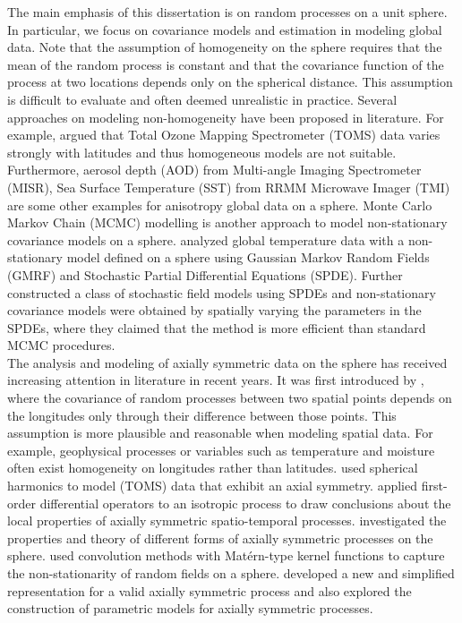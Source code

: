 The main emphasis of this dissertation is on random processes on a unit sphere. In particular, we focus on covariance models and estimation in modeling global data. Note that the assumption of homogeneity on the sphere requires that the mean of the random process is constant and that the covariance function of the process at two locations depends only on the spherical distance. This assumption is difficult to evaluate and often deemed unrealistic in practice. Several approaches on modeling non-homogeneity have been proposed in literature. For example, \cite{Stein2007} argued that Total Ozone Mapping Spectrometer (TOMS) data varies strongly with latitudes and thus homogeneous models are not suitable. Furthermore, aerosol depth (AOD) from Multi-angle Imaging Spectrometer (MISR), Sea Surface Temperature (SST) from RRMM Microwave Imager (TMI) are some other examples for anisotropy global data on a sphere. Monte Carlo Markov Chain (MCMC) modelling is another approach to model non-stationary covariance models on a sphere. \cite{Lindgren2011} analyzed global temperature data with a non-stationary model defined on a sphere using Gaussian Markov Random Fields (GMRF) and Stochastic Partial Differential Equations (SPDE). Further \cite{BolinLindgren2011} constructed a class of stochastic field models using SPDEs and non-stationary covariance models were obtained by spatially varying the parameters in the SPDEs, where they claimed that the method is more efficient than standard MCMC procedures. \\

The analysis and modeling of axially symmetric data on the sphere has received increasing attention in literature in recent years. It was first introduced by \cite{Jones1963}, where the covariance of random processes between two spatial points depends on the longitudes only through their difference between those points. This assumption is more plausible and reasonable when modeling spatial data. For example, geophysical processes or variables such as temperature and moisture often exist homogeneity on longitudes rather than latitudes. \cite{Stein2007} used spherical harmonics to model (TOMS) data that exhibit an axial symmetry. \cite{JunStein2008} applied first-order differential operators to an isotropic process to draw conclusions about the local properties of axially symmetric spatio-temporal processes. \cite{HitczenkoStein2012} investigated the properties and theory of different forms of axially symmetric processes on the sphere.  \cite{Li2013} used convolution methods with Mat\'{e}rn-type kernel functions to capture the non-stationarity of random fields on a sphere. \cite{Huang2012} developed a new and simplified representation for a valid axially symmetric process and also explored the construction of parametric models for axially symmetric processes.\\

